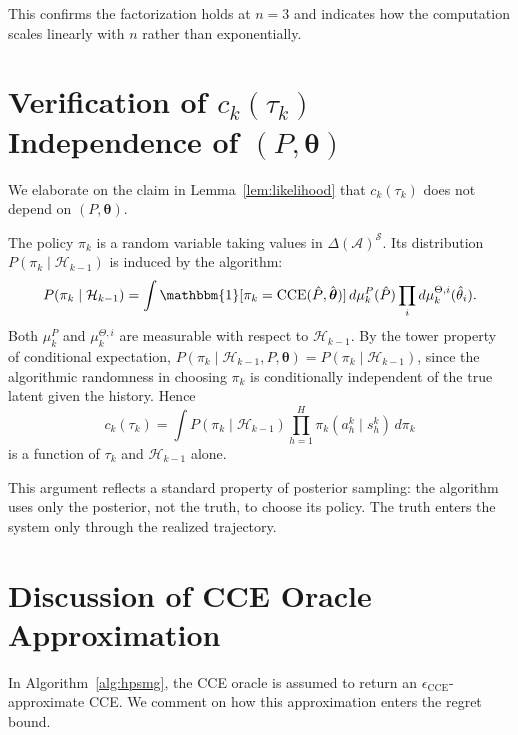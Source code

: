 \documentclass{article}
\begin{document}
This confirms the factorization holds at $n=3$ and indicates how the computation scales linearly with $n$ rather than exponentially.

\section{Verification of \texorpdfstring{$c_k(\tau_k)$}{c\_k(tau\_k)} Independence of \texorpdfstring{$(P, \boldsymbol{\theta})$}{(P, theta)}}
\label{app:ck}

We elaborate on the claim in Lemma~\ref{lem:likelihood} that $c_k(\tau_k)$ does not depend on $(P, \boldsymbol{\theta})$.

The policy $\pi_k$ is a random variable taking values in $\Delta(\mathcal{A})^{\mathcal{S}}$. Its distribution $P(\pi_k \mid \mathcal{H}_{k-1})$ is induced by the algorithm:
\begin{equation}
P(\pi_k \mid \mathcal{H}_{k-1}) = \int \mathbbm{1}[\pi_k = \mathrm{CCE}(\hat{P}, \hat{\boldsymbol{\theta}})] \, d\mu_k^P(\hat{P}) \prod_i d\mu_k^{\Theta,i}(\hat{\theta}_i).
\end{equation}
Both $\mu_k^P$ and $\mu_k^{\Theta,i}$ are measurable with respect to $\mathcal{H}_{k-1}$. By the tower property of conditional expectation, $P(\pi_k \mid \mathcal{H}_{k-1}, P, \boldsymbol{\theta}) = P(\pi_k \mid \mathcal{H}_{k-1})$, since the algorithmic randomness in choosing $\pi_k$ is conditionally independent of the true latent given the history. Hence
\begin{equation}
c_k(\tau_k) = \int P(\pi_k \mid \mathcal{H}_{k-1}) \prod_{h=1}^H \pi_k(a_h^k \mid s_h^k) \, d\pi_k
\end{equation}
is a function of $\tau_k$ and $\mathcal{H}_{k-1}$ alone.

This argument reflects a standard property of posterior sampling: the algorithm uses only the posterior, not the truth, to choose its policy. The truth enters the system only through the realized trajectory.

\section{Discussion of CCE Oracle Approximation}
\label{app:cce}

In Algorithm~\ref{alg:hpsmg}, the CCE oracle is assumed to return an $\epsilon_{\mathrm{CCE}}$-approximate CCE. We comment on how this approximation enters the regret bound.
\end{document}
